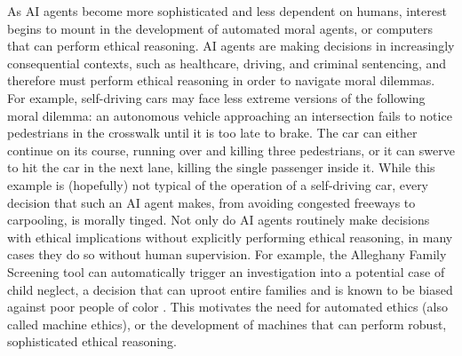 %
\begin{isabellebody}%
%
%
\isadelimtheory
%
\endisadelimtheory
%
\isatagtheory
%
\endisatagtheory
{\isafoldtheory}%
%
\isadelimtheory
%
\endisadelimtheory
%
\isadelimdocument
%
\endisadelimdocument
%
\isatagdocument
%
\isamarkuptrue%
%
\endisatagdocument
{\isafolddocument}%
%
\isadelimdocument
%
\endisadelimdocument
%
\begin{isamarkuptext}%
As AI agents become more sophisticated and less dependent on humans, interest begins to mount
in the development of automated moral agents, or computers that can perform ethical reasoning. 
AI agents are making decisions in increasingly 
consequential contexts, such as healthcare, driving, and criminal sentencing, and therefore 
must perform ethical reasoning in order to navigate moral dilemmas. For example, self-driving
cars may face less extreme versions of the following moral dilemma: an autonomous vehicle approaching 
an intersection fails to notice pedestrians in the crosswalk until it is too late to brake. The car 
can either continue on its course, running over and killing three pedestrians, or it can swerve to 
hit the car in the next lane, killing the single passenger inside it. While this example is (hopefully) 
not typical of the operation of a self-driving car, every decision that such an AI agent makes, from 
avoiding congested freeways to carpooling, is morally tinged. Not only do AI agents routinely make decisions with 
ethical implications without explicitly performing ethical
reasoning, in many cases they do so without human supervision. For example, the Alleghany Family Screening 
tool can automatically trigger an investigation into a potential case of child neglect, a decision that 
can uproot entire families and is known to be biased against poor people of color \citep{eubanks}. 
This motivates the need for automated ethics (also called machine ethics), 
or the development of machines that can perform robust, sophisticated ethical reasoning. 


\end{isamarkuptext}
\end{isabellebody}

